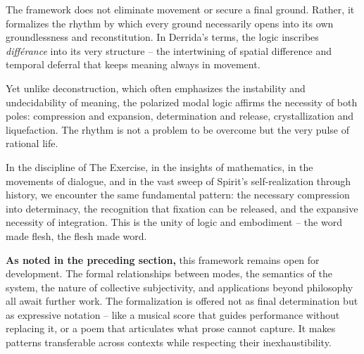 \documentclass[12pt]{book}
\begin{document}
The framework does not eliminate movement or secure a final ground. Rather, it formalizes the rhythm by which every ground necessarily opens into its own groundlessness and reconstitution. In Derrida's terms, the logic inscribes \textit{différance} into its very structure -- the intertwining of spatial difference and temporal deferral that keeps meaning always in movement.

Yet unlike deconstruction, which often emphasizes the instability and undecidability of meaning, the polarized modal logic affirms the necessity of both poles: compression and expansion, determination and release, crystallization and liquefaction. The rhythm is not a problem to be overcome but the very pulse of rational life.

In the discipline of The Exercise, in the insights of mathematics, in the movements of dialogue, and in the vast sweep of Spirit's self-realization through history, we encounter the same fundamental pattern: the necessary compression into determinacy, the recognition that fixation can be released, and the expansive necessity of integration. This is the unity of logic and embodiment -- the word made flesh, the flesh made word.

\textbf{As noted in the preceding section,} this framework remains open for development. The formal relationships between modes, the semantics of the system, the nature of collective subjectivity, and applications beyond philosophy all await further work. The formalization is offered not as final determination but as expressive notation -- like a musical score that guides performance without replacing it, or a poem that articulates what prose cannot capture. It makes patterns transferable across contexts while respecting their inexhaustibility.

\printbibliography
\end{document}
